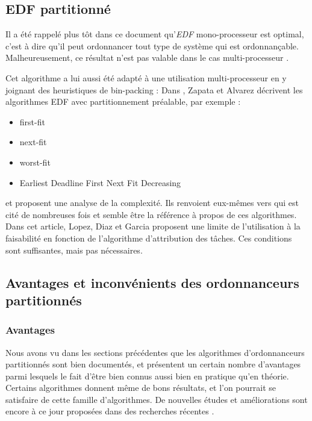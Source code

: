 \documentclass[11pt,a4paper,oneside]{report}
\begin{document}
	
	\subsection{EDF partitionné}
	Il a été rappelé plus tôt dans ce document qu'\textit{EDF} mono-processeur est optimal, 
	c'est à dire qu'il peut ordonnancer tout type de système qui est ordonnançable. 
	Malheureusement, ce résultat n'est pas valable dans le cas multi-processeur \cite{dertouzos_multiprocessor_1989}.\medskip
	
	Cet algorithme a lui aussi été adapté à une utilisation multi-processeur en y joignant 
	des heuristiques de bin-packing : \medskip
	Dans \cite{pereira_zapata_edf_2005}, Zapata et Alvarez décrivent les algorithmes 
	EDF avec partitionnement préalable, par exemple : \medskip
	\begin{itemize}
		\item first-fit
		\item next-fit
		\item worst-fit
		\item Earliest Deadline First Next Fit Decreasing
	\end{itemize}
	et proposent une analyse de la complexité. Ils renvoient eux-mêmes vers 
	\cite{lopez_utilization_2004} 
	qui est cité de nombreuses fois et semble être la référence à propos de ces algorithmes. 
	Dans cet article, Lopez, Diaz et Garcia proposent une limite de l'utilisation à la 
	faisabilité en fonction de l'algorithme d'attribution des tâches. Ces conditions 
	sont suffisantes, mais pas nécessaires.\medskip
	
	
	
	\subsection{Avantages et inconvénients des ordonnanceurs partitionnés}
	\subsubsection{Avantages}
	Nous avons vu dans les sections précédentes que les algorithmes d'ordonnanceurs 
	partitionnés sont bien documentés, et présentent un certain nombre d'avantages parmi lesquels 
	le fait d'être bien connus aussi bien en pratique qu'en théorie. 
	Certains algorithmes donnent même de bons résultats, et l'on pourrait se satisfaire de 
	cette famille d'algorithmes. De nouvelles études et améliorations sont encore à ce jour proposées 
	dans des recherches récentes \cite{rodriguez_paul_multi-criteria_2013}.\medskip
	
\end{document}
